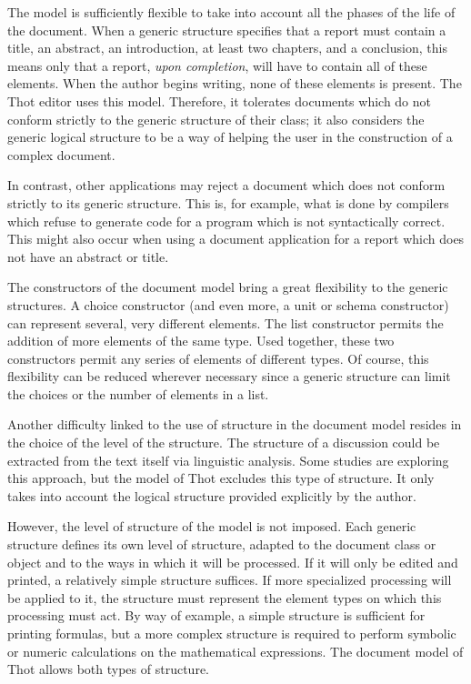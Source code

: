 The model is sufficiently flexible to take into account all the phases
of the life of the document.  When a generic structure specifies that
a report must contain a title, an abstract, an introduction, at least
two chapters, and a conclusion, this means only that a report, {\em
upon completion}, will have to contain all of these elements.  When
the author begins writing, none of these elements is present.  The
Thot editor uses this model.  Therefore, it tolerates documents which
do not conform strictly to the generic structure of their class;  it
also considers the generic logical structure to be a way of helping
the user in the construction of a complex document.

In contrast, other applications may reject a document which does not
conform strictly to its generic structure.  This is, for example, what
is done by compilers which refuse to generate code for a program which
is not syntactically correct.  This might also occur when using a
document application for a report which does not have an abstract or
title.

The constructors of the document model bring a great flexibility to the
generic structures.  A choice constructor (and even more, a unit or
schema constructor)  can represent several, very different elements.
The list constructor permits the addition of more elements of the
same type.  Used together, these two constructors permit any series of
elements of different types.  Of course, this flexibility can be
reduced wherever necessary since a generic structure can limit the
choices or the number of elements in a list.

Another difficulty linked to the use of structure in the document
model resides in the choice of the level of the structure.  The
structure of a discussion could be extracted from the text itself via
linguistic analysis.  Some studies are exploring this approach, but
the model of Thot excludes this type of structure.  It only takes into
account the logical structure provided explicitly by the author.

However, the level of structure of the model is not imposed.  Each
generic structure defines its own level of structure, adapted to the
document class or object and to the ways in which it will be
processed.  If it will only be edited and printed, a  relatively
simple structure suffices.  If more specialized processing will be
applied to it, the structure must represent the element types on which
this processing must act.  By way of example, a simple structure is
sufficient for printing formulas, but a more complex structure is
required to perform symbolic or numeric calculations on the
mathematical expressions.  The document model of Thot allows both
types of structure.

